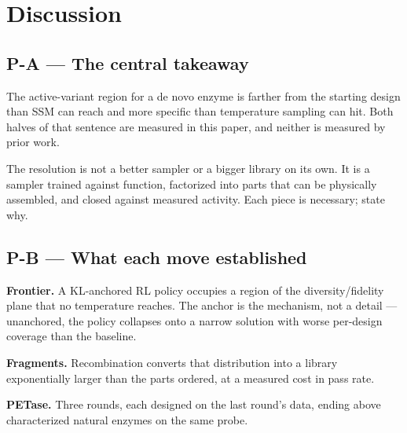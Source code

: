 \section{Discussion}
\label{sec:discussion}


\subsection*{P-A --- The central takeaway}
\begin{planlist}
  \item The active-variant region for a de novo enzyme is farther from the
        starting design than SSM can reach and more specific than temperature
        sampling can hit. Both halves of that sentence are measured in this
        paper, and neither is measured by prior work.
  \item The resolution is not a better sampler or a bigger library on its own.
        It is a sampler trained against function, factorized into parts that can
        be physically assembled, and closed against measured activity. Each
        piece is necessary; state why.
\end{planlist}

\subsection*{P-B --- What each move established}
\begin{planlist}
  \item \textbf{Frontier.} A KL-anchored RL policy occupies a region of the
        diversity/fidelity plane that no temperature reaches. The anchor is the
        mechanism, not a detail --- unanchored, the policy collapses onto a
        narrow solution with worse per-design coverage than the baseline.
  \item \textbf{Fragments.} Recombination converts that distribution into a
        library exponentially larger than the parts ordered, at a measured cost
        in pass rate.
  \item \textbf{PETase.} Three rounds, each designed on the last round's data,
        ending above characterized natural enzymes on the same probe.
\end{planlist}

